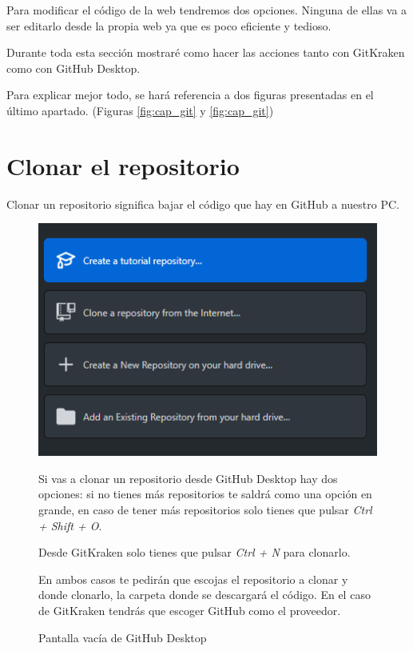 \pagestyle{fancy}


Para modificar el código de la web tendremos dos opciones. Ninguna de ellas va a ser editarlo desde la propia web ya que es poco eficiente y tedioso.

Durante toda esta sección mostraré como hacer las acciones tanto con GitKraken como con GitHub Desktop.

Para explicar mejor todo, se hará referencia a dos figuras presentadas en el último apartado. (Figuras \ref{fig:cap_git} y \ref{fig:cap_git})

\section{Clonar el repositorio}

Clonar un repositorio significa bajar el código que hay en GitHub a nuestro PC.

\begin{figure}[ht]
    \begin{minipage}{0.4\linewidth}
        \centering
        \includegraphics[width=0.9\linewidth,]{git_desk_vacio.png}
        \caption{Pantalla vacía de GitHub Desktop}
        \label{fig:crea_repo}
    \end{minipage}%
    \begin{minipage}[b]{0.6\linewidth}
        \setlength{\parindent}{0.2in}

        Si vas a clonar un repositorio desde GitHub Desktop hay dos opciones: si no tienes más repositorios te saldrá como una opción en grande, en caso de tener más repositorios solo tienes que pulsar \textit{Ctrl + Shift + O}.

        Desde GitKraken solo tienes que pulsar \textit{Ctrl + N} para clonarlo.

        En ambos casos te pedirán que escojas el repositorio a clonar y donde clonarlo, la carpeta donde se descargará el código. En el caso de GitKraken tendrás que escoger GitHub como el proveedor.

    \end{minipage}
\end{figure}


